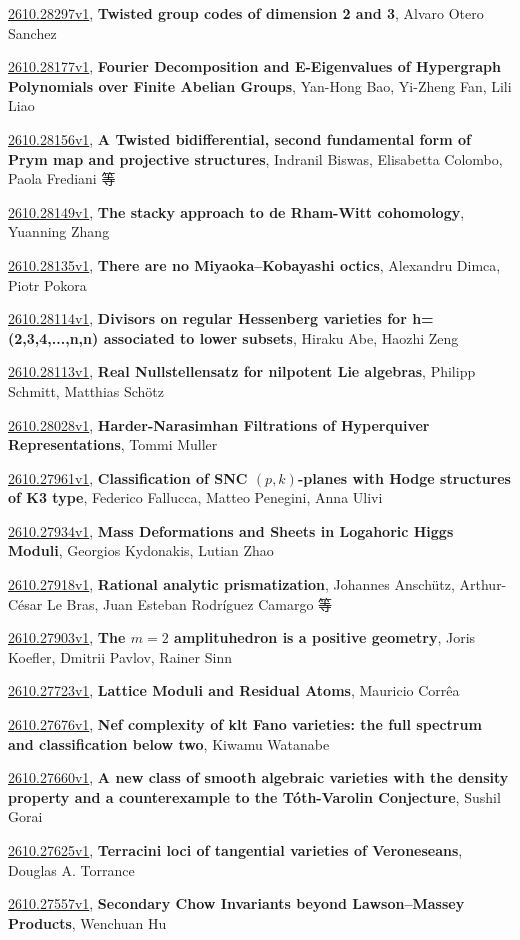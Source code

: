 \documentclass[9pt, a4paper]{article}
\theoremstyle{plain}
\theoremstyle{definition}
\theoremstyle{remark}
\newcommand{\arxiv}[3]{\href{https://arxiv.org/abs/#1}{#1}, \textbf{\textcolor{arxivblue}{#2}}, #3}
\begin{document}
\arxiv{2610.28297v1}{Twisted group codes of dimension 2 and 3}{Alvaro Otero Sanchez}

\arxiv{2610.28177v1}{Fourier Decomposition and E-Eigenvalues of Hypergraph Polynomials over Finite Abelian Groups}{Yan-Hong Bao, Yi-Zheng Fan, Lili Liao}

\arxiv{2610.28156v1}{A Twisted bidifferential, second fundamental form of Prym map and projective structures}{Indranil Biswas, Elisabetta Colombo, Paola Frediani 等}

\arxiv{2610.28149v1}{The stacky approach to de Rham-Witt cohomology}{Yuanning Zhang}

\arxiv{2610.28135v1}{There are no Miyaoka--Kobayashi octics}{Alexandru Dimca, Piotr Pokora}

\arxiv{2610.28114v1}{Divisors on regular Hessenberg varieties for h=(2,3,4,...,n,n) associated to lower subsets}{Hiraku Abe, Haozhi Zeng}

\arxiv{2610.28113v1}{Real Nullstellensatz for nilpotent Lie algebras}{Philipp Schmitt, Matthias Schötz}

\arxiv{2610.28028v1}{Harder-Narasimhan Filtrations of Hyperquiver Representations}{Tommi Muller}

\arxiv{2610.27961v1}{Classification of SNC $(p,k)$-planes with Hodge structures of K3 type}{Federico Fallucca, Matteo Penegini, Anna Ulivi}

\arxiv{2610.27934v1}{Mass Deformations and Sheets in Logahoric Higgs Moduli}{Georgios Kydonakis, Lutian Zhao}

\arxiv{2610.27918v1}{Rational analytic prismatization}{Johannes Anschütz, Arthur-César Le Bras, Juan Esteban Rodríguez Camargo 等}

\arxiv{2610.27903v1}{The $m=2$ amplituhedron is a positive geometry}{Joris Koefler, Dmitrii Pavlov, Rainer Sinn}

\arxiv{2610.27723v1}{Lattice Moduli and Residual Atoms}{Mauricio Corrêa}

\arxiv{2610.27676v1}{Nef complexity of klt Fano varieties: the full spectrum and classification below two}{Kiwamu Watanabe}

\arxiv{2610.27660v1}{A new class of smooth algebraic varieties with the density property and a counterexample to the Tóth-Varolin Conjecture}{Sushil Gorai}

\arxiv{2610.27625v1}{Terracini loci of tangential varieties of Veroneseans}{Douglas A. Torrance}

\arxiv{2610.27557v1}{Secondary Chow Invariants beyond Lawson--Massey Products}{Wenchuan Hu}
\end{document}
